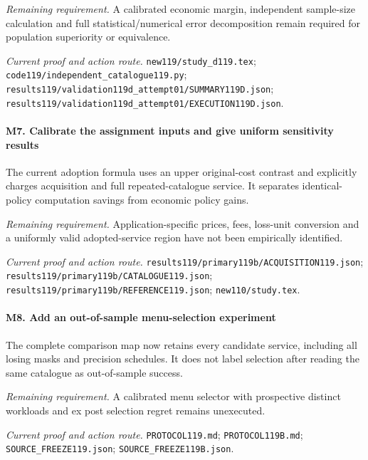 \par\emph{Remaining requirement.} A calibrated economic margin, independent sample-size calculation and full statistical/\allowbreak{}numerical error decomposition remain required for population superiority or equivalence.

\par\emph{Current proof and action route.} \nolinkurl{new119/study_d119.tex}; \nolinkurl{code119/independent_catalogue119.py}; \nolinkurl{results119/validation119d_attempt01/SUMMARY119D.json}; \nolinkurl{results119/validation119d_attempt01/EXECUTION119D.json}.

\paragraph{M7. Calibrate the assignment inputs and give uniform sensitivity results}

The current adoption formula uses an upper original-cost contrast and explicitly charges acquisition and full repeated-catalogue service. It separates identical-policy computation savings from economic policy gains.

\par\emph{Remaining requirement.} Application-specific prices, fees, loss-unit conversion and a uniformly valid adopted-service region have not been empirically identified.

\par\emph{Current proof and action route.} \nolinkurl{results119/primary119b/ACQUISITION119.json}; \nolinkurl{results119/primary119b/CATALOGUE119.json}; \nolinkurl{results119/primary119b/REFERENCE119.json}; \nolinkurl{new110/study.tex}.

\paragraph{M8. Add an out-of-sample menu-selection experiment}

The complete comparison map now retains every candidate service, including all losing masks and precision schedules. It does not label selection after reading the same catalogue as out-of-sample success.

\par\emph{Remaining requirement.} A calibrated menu selector with prospective distinct workloads and ex post selection regret remains unexecuted.

\par\emph{Current proof and action route.} \nolinkurl{PROTOCOL119.md}; \nolinkurl{PROTOCOL119B.md}; \nolinkurl{SOURCE_FREEZE119.json}; \nolinkurl{SOURCE_FREEZE119B.json}.

